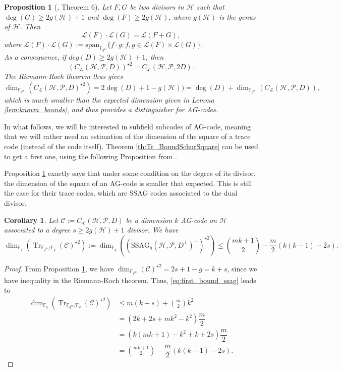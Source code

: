 \documentclass[a4paper]{article}
\newtheorem{prop1}{Proposition}
\newtheorem{coro1}{Corollary}
\newcommand{\calP}{\mathcal{P}}
\newcommand{\calH}{\mathcal{H}}
\newcommand{\calL}{\mathcal{L}}
\newcommand{\calC}{\mathcal{C}}
\newcommand{\fqm}{\mathbb{F}_{q^m}}
\newcommand{\fq}{\mathbb{F}_{q}}
\newcommand{\Tr}[1]{\operatorname{Tr}_{\mathbb{F}_{q^m}/\fq}\left(#1\right)}
\begin{document}
\begin{prop1}[\cite{mumford}, Theorem 6] \label{prop:mumford_result}
Let $F,G$ be two divisors in $\calH$ such that $\deg(G) \geq 2g(\calH)+1$ and $\deg(F) \geq 2g(\calH)$, where $g(\calH)$ is the genus of $\calH$. Then
\[ \calL(F) \cdot \calL(G) = \calL(F+G),\]
where $\calL(F) \cdot \calL(G) := \mathrm{span}_{\mathbb{F}_{q^m}}\{ f \cdot g : f,g \in \calL(F) \times \calL(G) \}$.\\ 
As a consequence, if $deg(D) \geq 2g(\calH)+1$, then 
\[ (C_{\calL}(\calH,\mathcal{P},D))^{\star2} = C_{\calL}(\calH,\calP,2D).\]
The Riemann-Roch theorem thus gives
\[ \dim_{\mathbb{F}_{q^m}}(C_{\calL}(\calH,\mathcal{P},D)^{\star2}) = 2\deg(D)+1-g(\calH)) = \deg(D) + \dim_{\fqm}(C_{\calL}(\calH,\mathcal{P},D)), \]
which is much smaller than the expected dimension given in Lemma \ref{lem:known_bounds}, and thus provides a distinguisher for AG-codes.
\end{prop1}

In what follows, we will be interested in subfield subcodes of AG-code, meaning that we will rather need an estimation of the dimension of the square of a trace code (instead of the code itself). Theorem \ref{th:Tr_BoundSchurSquare} can be used to get a first one, using the following Proposition from \cite{rocco}.

Proposition \ref{prop:mumford_result} exactly says that under some condition on the degree of its divisor, the dimension of the square of an AG-code is smaller that expected. This is still the case for their trace codes, which are SSAG codes associated to the dual divisor.

\begin{coro1} \label{square_ssag_bound}
Let $\mathcal{C} := C_{\calL}(\calH,\mathcal{P},D)$ be a dimension $k$ AG-code on $\calH$ associated to a degree $s \geq 2g(\calH)+1$ divisor. We have 
\[ \dim_{\fq}(\Tr{\calC}^{\star2}) := \dim_{\fq} ((\mathrm{SSAG}_{q}(\calH,\calP,D^{\perp})^{\perp})^{\star2})  \leq \binom{mk+1}{2} - \dfrac{m}{2} (k(k-1)-2s).\]
\end{coro1}

\begin{proof}
From Proposition \ref{prop:mumford_result}, we have $\dim_{\fqm}(\calC)^{\star2} = 2s+1-g = k+s$, since we have inequality in the Riemann-Roch theorem. Thus, \eqref{eq:first_bound_ssag} leads to
\begin{align*}
    \dim_{\fq}(\Tr{\calC}^{\star2}) &\leq m(k+s) + \binom{m}{2}k^2 \\
                                        &= (2k+2s+mk^2-k^2) \dfrac{m}{2} \\
                                        &= (k(mk+1)-k^2+k+2s) \dfrac{m}{2} \\
                                        &= \binom{mk+1}{2} - \dfrac{m}{2}(k(k-1)-2s) .
\end{align*}
\end{proof}
\end{document}
